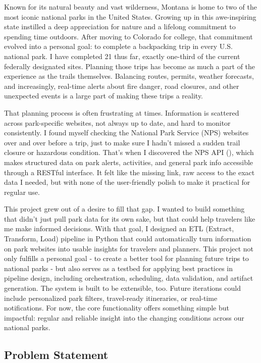 \documentclass[
  letterpaper,
  DIV=11,
  numbers=noendperiod]{scrartcl}
\begin{document}
Known for its natural beauty and vast wilderness, Montana is home to two
of the most iconic national parks in the United States. Growing up in
this awe-inspiring state instilled a deep appreciation for nature and a
lifelong commitment to spending time outdoors. After moving to Colorado
for college, that commitment evolved into a personal goal: to complete a
backpacking trip in every U.S. national park. I have completed 21 thus
far, exactly one-third of the current federally designated sites.
Planning those trips has become as much a part of the experience as the
trails themselves. Balancing routes, permits, weather forecasts, and
increasingly, real-time alerts about fire danger, road closures, and
other unexpected events is a large part of making these trips a reality.

That planning process is often frustrating at times. Information is
scattered across park-specific websites, not always up to date, and hard
to monitor consistently. I found myself checking the National Park
Service (NPS) websites over and over before a trip, just to make sure I
hadn't missed a sudden trail closure or hazardous condition. That's when
I discovered the NPS API (), which makes
structured data on park alerts, activities, and general park info
accessible through a RESTful interface. It felt like the missing link,
raw access to the exact data I needed, but with none of the
user-friendly polish to make it practical for regular use.

This project grew out of a desire to fill that gap. I wanted to build
something that didn't just pull park data for its own sake, but that
could help travelers like me make informed decisions. With that goal, I
designed an ETL (Extract, Transform, Load) pipeline in Python that could
automatically turn information on park websites into usable insights for
travelers and planners. This project not only fulfills a personal goal -
to create a better tool for planning future trips to national parks -
but also serves as a testbed for applying best practices in pipeline
design, including orchestration, scheduling, data validation, and
artifact generation. The system is built to be extensible, too. Future
iterations could include personalized park filters, travel-ready
itineraries, or real-time notifications. For now, the core functionality
offers something simple but impactful: regular and reliable insight into
the changing conditions across our national parks.

\subsection{Problem Statement}\label{problem-statement}
\end{document}
